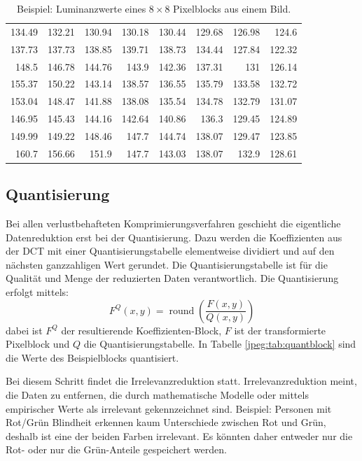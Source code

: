 \begin{table}[b]
    \centering
    \begin{tabular}{*{8}{r}}
        134.49 & 132.21 & 130.94 & 130.18 & 130.44 & 129.68 & 126.98 & 124.6\phantom{0}  \\
        137.73 & 137.73 & 138.85 & 139.71 & 138.73 & 134.44 & 127.84 & 122.32 \\
        148.5\phantom{0}  & 146.78 & 144.76 & 143.9\phantom{0}  & 142.36 & 137.31 & 131\phantom{.00}    & 126.14 \\
        155.37 & 150.22 & 143.14 & 138.57 & 136.55 & 135.79 & 133.58 & 132.72 \\
        153.04 & 148.47 & 141.88 & 138.08 & 135.54 & 134.78 & 132.79 & 131.07 \\
        146.95 & 145.43 & 144.16 & 142.64 & 140.86 & 136.3\phantom{0}  & 129.45 & 124.89 \\
        149.99 & 149.22 & 148.46 & 147.7\phantom{0}  & 144.74 & 138.07 & 129.47 & 123.85 \\
        160.7\phantom{0}  & 156.66 & 151.9\phantom{0}  & 147.7\phantom{0}  & 143.03 & 138.07 & 132.9\phantom{0}  & 128.61
    \end{tabular}
    \caption{Beispiel: Luminanzwerte eines \(8\times8\) Pixelblocks aus einem Bild.
        \label{jpeg:tab:orgblock}}
\end{table}

\subsection{Quantisierung
\label{jpeg:subsection:quantisierung}}
Bei allen verlustbehafteten Komprimierungsverfahren geschieht die eigentliche Datenreduktion erst bei der Quantisierung.
Dazu werden die Koeffizienten aus der DCT mit einer Quantisierungs\-tabelle elementweise dividiert und auf den nächsten ganzzahligen Wert gerundet.
Die Quantisierungs\-tabelle ist für die Qualität und Menge der reduzierten Daten verantwortlich.
Die Quantisierung erfolgt \mbox{mittels:} 
\begin{equation}
    F^Q(x,y)
    =
    \operatorname{round} \left(
    \frac{F(x,y)}{Q(x,y)}
    \right)
\end{equation}
dabei ist \(F^Q\) der resultierende Koeffizienten-Block, \(F\) ist der transformierte Pixelblock und \(Q\) die Quantisierungstabelle.
In Tabelle \ref{jpeg:tab:quantblock} sind die Werte des Beispielblocks quantisiert.

Bei diesem Schritt findet die Irrelevanzreduktion statt.
Irrelevanzreduktion meint, die Daten zu entfernen, die durch mathematische Modelle oder mittels empirischer Werte als irrelevant gekennzeichnet sind.
Beispiel: Personen mit Rot/Grün Blindheit erkennen kaum Unterschiede zwischen Rot und Grün, deshalb ist eine der beiden Farben irrelevant.
Es könnten daher entweder nur die Rot- oder nur die Grün-Anteile gespeichert werden.

